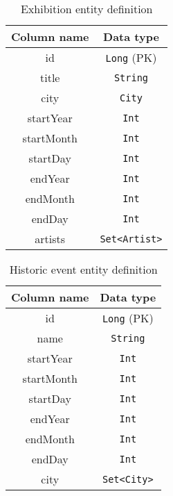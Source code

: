 \begin{table}[ht]
    \begin{center}
        \begin{tabular}{|c|c|}
            \hline
            Column name & Data type\\ \hline\hline
            id & \texttt{Long} (PK) \\\hline
            title & \texttt{String} \\\hline
            city & \texttt{City} \\\hline
            startYear & \texttt{Int} \\\hline
            startMonth & \texttt{Int} \\\hline
            startDay & \texttt{Int} \\\hline
            endYear & \texttt{Int} \\\hline
            endMonth & \texttt{Int} \\\hline
            endDay & \texttt{Int} \\\hline
            artists & \texttt{Set<Artist>} \\\hline
        \end{tabular}
    \end{center}
    \caption{Exhibition entity definition}
    \label{tab:exhibition-entity}
\end{table}

\begin{table}[ht]
    \begin{center}
        \begin{tabular}{|c|c|}
            \hline
            Column name & Data type\\ \hline\hline
            id & \texttt{Long} (PK) \\\hline
            name & \texttt{String} \\\hline
            startYear & \texttt{Int} \\\hline
            startMonth & \texttt{Int} \\\hline
            startDay & \texttt{Int} \\\hline
            endYear & \texttt{Int} \\\hline
            endMonth & \texttt{Int} \\\hline
            endDay & \texttt{Int} \\\hline
            city & \texttt{Set<City>} \\\hline
        \end{tabular}
    \end{center}
    \caption{Historic event entity definition}
    \label{tab:historic-event-entity}
\end{table}

